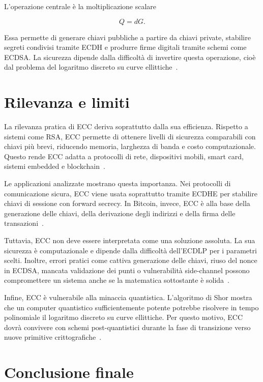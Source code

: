 \documentclass[12pt,a4paper,oneside]{report}
\begin{document}
L'operazione centrale è la moltiplicazione scalare

\[
Q=dG.
\]

Essa permette di generare chiavi pubbliche a partire da chiavi private, stabilire segreti condivisi tramite ECDH e produrre firme digitali tramite schemi come ECDSA. La sicurezza dipende dalla difficoltà di invertire questa operazione, cioè dal problema del logaritmo discreto su curve ellittiche~\cite{margara_ec,margara_dh,fips_186_5,sec1}.

\section{Rilevanza e limiti}

La rilevanza pratica di ECC deriva soprattutto dalla sua efficienza. Rispetto a sistemi come RSA, ECC permette di ottenere livelli di sicurezza comparabili con chiavi più brevi, riducendo memoria, larghezza di banda e costo computazionale. Questo rende ECC adatta a protocolli di rete, dispositivi mobili, smart card, sistemi embedded e blockchain~\cite{nist_sp800_57,sec1}.

Le applicazioni analizzate mostrano questa importanza. Nei protocolli di comunicazione sicura, ECC viene usata soprattutto tramite ECDHE per stabilire chiavi di sessione con forward secrecy. In Bitcoin, invece, ECC è alla base della generazione delle chiavi, della derivazione degli indirizzi e della firma delle transazioni~\cite{margara_ssl,margara_bitcoin}.

Tuttavia, ECC non deve essere interpretata come una soluzione assoluta. La sua sicurezza è computazionale e dipende dalla difficoltà dell'ECDLP per i parametri scelti. Inoltre, errori pratici come cattiva generazione delle chiavi, riuso del nonce in ECDSA, mancata validazione dei punti o vulnerabilità side-channel possono compromettere un sistema anche se la matematica sottostante è solida~\cite{margara_complessita,fips_186_5,sec1}.

Infine, ECC è vulnerabile alla minaccia quantistica. L'algoritmo di Shor mostra che un computer quantistico sufficientemente potente potrebbe risolvere in tempo polinomiale il logaritmo discreto su curve ellittiche. Per questo motivo, ECC dovrà convivere con schemi post-quantistici durante la fase di transizione verso nuove primitive crittografiche~\cite{margara_pqc}.

\section{Conclusione finale}
\end{document}
